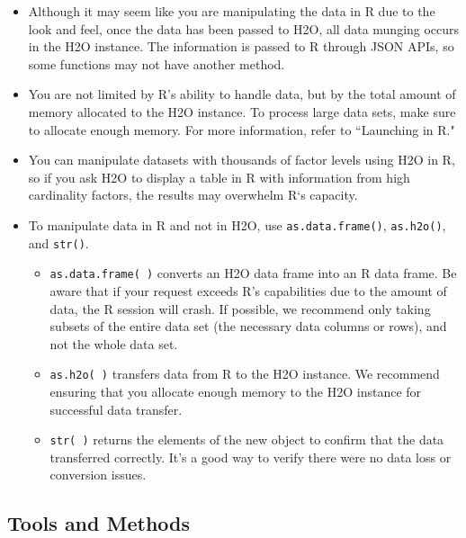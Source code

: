 \documentclass[11pt]{article}
\begin{document}
{\begin{itemize}
\item Although it may seem like you are manipulating the data in R due to the look and feel, once the data has been passed to H2O, all data munging occurs in the H2O instance. The information is passed to R through JSON APIs, so some functions may not have another method. 
\item You are not limited by R's ability to handle data, but by the total amount of memory allocated to the H2O instance. To process large data sets, make sure to allocate enough memory. For more information, refer to ``Launching in R." 
\item You can manipulate datasets with thousands of factor levels using H2O in R, so if you ask H2O to display a table in R with information from high cardinality factors, the results may overwhelm R`s capacity. 
\item To manipulate data in R and not in H2O, use {\texttt{as.data.frame()}}, {\texttt{as.h2o()}}, and {\texttt{str()}}. \begin{itemize}
\item {\texttt{as.data.frame( )}} converts an H2O data frame into an R data frame. Be aware that if your request exceeds R’s capabilities due to the amount of data, the R session will crash. If possible, we recommend only taking subsets of the entire data set (the necessary data columns or rows), and not the whole data set. 
\item {\texttt{as.h2o( )}} transfers data from R to the H2O instance. We recommend ensuring that you allocate enough memory to the H2O instance for successful data transfer.
\item {\texttt{str( )}} returns the elements of the new object to confirm that the data transferred correctly. It’s a good way to verify there were no data loss or conversion issues. 
\end{itemize}
\end{itemize}

\subsection{Tools and Methods}

}
\end{document}
